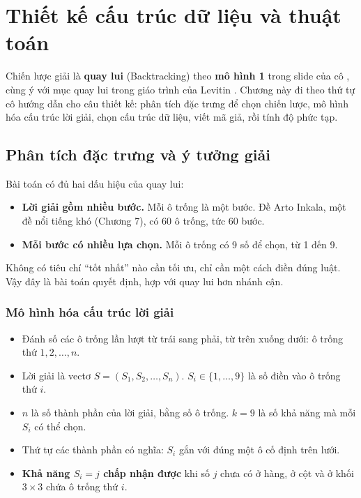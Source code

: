 \chapter{Thiết kế cấu trúc dữ liệu và thuật toán}

Chiến lược giải là \textbf{quay lui} (Backtracking) theo \textbf{mô hình 1} trong slide của cô \cite{slide-backtracking}, cùng ý với mục quay lui trong giáo trình của Levitin \cite{levitin}. Chương này đi theo thứ tự cô hướng dẫn cho câu thiết kế: phân tích đặc trưng để chọn chiến lược, mô hình hóa cấu trúc lời giải, chọn cấu trúc dữ liệu, viết mã giả, rồi tính độ phức tạp.

\section{Phân tích đặc trưng và ý tưởng giải}

Bài toán có đủ hai dấu hiệu của quay lui:

\begin{itemize}
  \item \textbf{Lời giải gồm nhiều bước.} Mỗi ô trống là một bước. Đề Arto Inkala, một đề nổi tiếng khó (Chương 7), có 60 ô trống, tức 60 bước.
  \item \textbf{Mỗi bước có nhiều lựa chọn.} Mỗi ô trống có 9 số để chọn, từ 1 đến 9.
\end{itemize}

Không có tiêu chí ``tốt nhất'' nào cần tối ưu, chỉ cần một cách điền đúng luật. Vậy đây là bài toán quyết định, hợp với quay lui hơn nhánh cận.

\subsection*{Mô hình hóa cấu trúc lời giải}

\begin{itemize}
  \item Đánh số các ô trống lần lượt từ trái sang phải, từ trên xuống dưới: ô trống thứ \(1, 2, \ldots, n\).
  \item Lời giải là vectơ \(S = (S_1, S_2, \ldots, S_n)\). \(S_i \in \{1, \ldots, 9\}\) là số điền vào ô trống thứ \(i\).
  \item \(n\) là số thành phần của lời giải, bằng số ô trống. \(k = 9\) là số khả năng mà mỗi \(S_i\) có thể chọn.
  \item Thứ tự các thành phần có nghĩa: \(S_i\) gắn với đúng một ô cố định trên lưới.
  \item \textbf{Khả năng \(S_i = j\) chấp nhận được} khi số \(j\) chưa có ở hàng, ở cột và ở khối \(3 \times 3\) chứa ô trống thứ \(i\).
\end{itemize}

